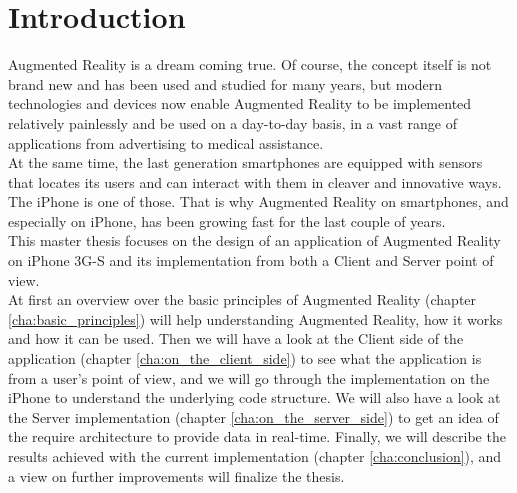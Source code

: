 \chapter{Introduction}
\label{cha:introduction}

Augmented Reality is a dream coming true. Of course, the concept itself is not brand new and has been used and studied for many years, but modern technologies and devices now enable Augmented Reality to be implemented relatively painlessly and be used on a day-to-day basis, in a vast range of applications from advertising to medical assistance.\\

At the same time, the last generation smartphones are equipped with sensors that locates its users and can interact with them in cleaver and innovative ways. The iPhone is one of those. That is why Augmented Reality on smartphones, and especially on iPhone, has been growing fast for the last couple of years.\\

This master thesis focuses on the design of an application of Augmented Reality on iPhone 3G-S and its implementation from both a Client and Server point of view.\\

At first an overview over the basic principles of Augmented Reality (chapter \ref{cha:basic_principles}) will help understanding Augmented Reality, how it works and how it can be used. Then we will have a look at the Client side of the application (chapter \ref{cha:on_the_client_side}) to see what the application is from a user's point of view, and we will go through the implementation on the iPhone to understand the underlying code structure. We will also have a look at the Server implementation (chapter \ref{cha:on_the_server_side}) to get an idea of the require architecture to provide data in real-time. Finally, we will describe the results achieved with the current implementation (chapter \ref{cha:conclusion}), and a view on further improvements will finalize the thesis.